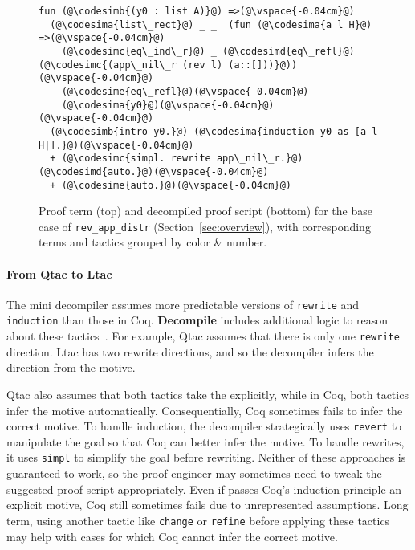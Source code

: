\begin{figure}
\begin{lstlisting}
fun (@\codesimb{(y0 : list A)}@) =>(@\vspace{-0.04cm}@)
  (@\codesima{list\_rect}@) _ _  (fun (@\codesima{a l H}@) =>(@\vspace{-0.04cm}@)
    (@\codesimc{eq\_ind\_r}@) _ (@\codesimd{eq\_refl}@) (@\codesimc{(app\_nil\_r (rev l) (a::[]))}@))(@\vspace{-0.04cm}@)
    (@\codesime{eq\_refl}@)(@\vspace{-0.04cm}@)
    (@\codesima{y0}@)(@\vspace{-0.04cm}@)
(@\vspace{-0.04cm}@)
- (@\codesimb{intro y0.}@) (@\codesima{induction y0 as [a l H|].}@)(@\vspace{-0.04cm}@)
  + (@\codesimc{simpl. rewrite app\_nil\_r.}@) (@\codesimd{auto.}@)(@\vspace{-0.04cm}@)
  + (@\codesime{auto.}@)(@\vspace{-0.04cm}@)
\end{lstlisting}
\vspace{-0.3cm}
\caption{Proof term (top) and decompiled proof script (bottom) for the base case of 
\lstinline{rev_app_distr} (Section~\ref{sec:overview}), with corresponding terms and tactics 
grouped by color \& number.}
\label{fig:rainbow}
\end{figure}

\paragraph{From Qtac to Ltac}
The mini decompiler assumes more predictable versions of \lstinline{rewrite} and \lstinline{induction}
than those in Coq. \textbf{Decompile} includes additional logic to reason about these tactics~\href{https://github.com/uwplse/coq-plugin-lib/blob/9ef05815c261de9c99b604c6b581ba1c4fbc1a46/src/coq/decompiler/decompiler.ml}{}. %
For example, Qtac assumes that there is only one \lstinline{rewrite} direction. Ltac has two rewrite directions,
and so the decompiler infers the direction from the motive.

Qtac also assumes that both tactics take the  explicitly,
while in Coq, both tactics infer the motive automatically.
Consequentially, Coq sometimes fails to infer the correct motive.
To handle induction, the decompiler strategically uses \lstinline{revert} to manipulate the goal
so that Coq can better infer the motive.
To handle rewrites, it uses \lstinline{simpl} to simplify the goal before rewriting.
Neither of these approaches is guaranteed to work, so the proof engineer may sometimes need to tweak the 
suggested proof script appropriately.
Even if  passes Coq's induction principle an explicit motive, Coq still sometimes fails due
to unrepresented assumptions.
Long term, using another tactic like \lstinline{change} or \lstinline{refine} before applying these tactics
may help with cases for which Coq cannot infer the correct motive.

